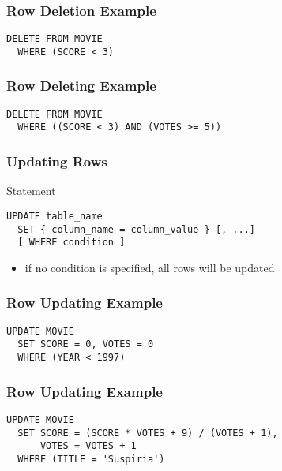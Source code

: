 \documentclass[dvipsnames]{beamer}
\theoremstyle{plain}
\begin{document}
\begin{frame}[fragile]
  \frametitle{Row Deletion Example}

  \begin{example}
    \begin{lstlisting}
DELETE FROM MOVIE
  WHERE (SCORE < 3)
    \end{lstlisting}
  \end{example}
\end{frame}

\begin{frame}[fragile]
  \frametitle{Row Deleting Example}

  \begin{example}
    \begin{lstlisting}
DELETE FROM MOVIE
  WHERE ((SCORE < 3) AND (VOTES >= 5))
    \end{lstlisting}
  \end{example}
\end{frame}

\begin{frame}[fragile]
  \frametitle{Updating Rows}

  \begin{block}{Statement}
    \begin{lstlisting}
UPDATE table_name
  SET { column_name = column_value } [, ...]
  [ WHERE condition ]
    \end{lstlisting}
  \end{block}

  \pause
  \begin{itemize}
    \item if no condition is specified, all rows will be updated
  \end{itemize}
\end{frame}

\begin{frame}[fragile]
  \frametitle{Row Updating Example}

  \begin{example}
    \begin{lstlisting}
UPDATE MOVIE
  SET SCORE = 0, VOTES = 0
  WHERE (YEAR < 1997)
    \end{lstlisting}
  \end{example}
\end{frame}

\begin{frame}[fragile]
  \frametitle{Row Updating Example}

  \begin{example}
    \begin{lstlisting}
UPDATE MOVIE
  SET SCORE = (SCORE * VOTES + 9) / (VOTES + 1),
      VOTES = VOTES + 1
  WHERE (TITLE = 'Suspiria')
    \end{lstlisting}
  \end{example}
\end{frame}
\end{document}
